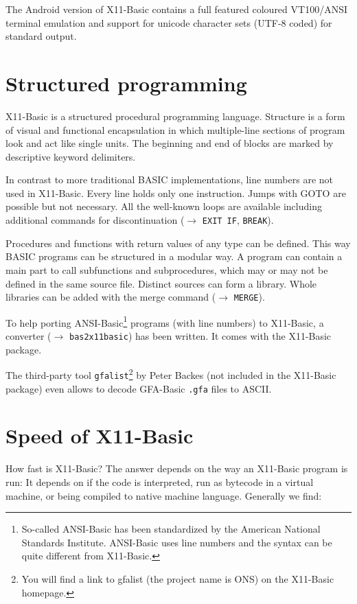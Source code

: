 The Android version of X11-Basic contains a full featured coloured 
VT100/ANSI terminal emulation and support for unicode character sets 
(UTF-8 coded) for standard output.


\section*{Structured programming}

X11-Basic is a structured procedural programming language.  Structure is a form
of visual and functional encapsulation in which multiple-line sections of
program look and act like single units. The beginning and end of blocks are
marked by descriptive keyword delimiters.

In contrast to more traditional BASIC implementations, line  numbers are not
used in X11-Basic. Every line holds only one instruction. Jumps with GOTO are
possible but not necessary. All the well-known loops are available including 
additional commands for discontinuation ($\longrightarrow$ \verb|EXIT IF|, \verb|BREAK|). 

Procedures and functions with return values of any type can be defined. This way
BASIC  programs can be structured in a modular way. A program can contain a main
part to call subfunctions and subprocedures, which may or may not be defined in
the same source file. Distinct sources can form a library. Whole libraries can
be added with the merge command ($\longrightarrow$ \verb|MERGE|).

To help porting ANSI-Basic\footnote{So-called ANSI-Basic has been  standardized
by the American National Standards Institute. ANSI-Basic uses line numbers and
the syntax can be quite different from X11-Basic.} programs (with line numbers)
to X11-Basic, a converter ($\longrightarrow$ \verb|bas2x11basic|) has been written. It comes
with the X11-Basic package. 

The third-party tool \verb|gfalist|\footnote{You will find a link to gfalist 
(the project name is ONS) on the X11-Basic homepage.} by Peter Backes (not
included in the X11-Basic package) even allows to decode GFA-Basic \verb|.gfa|
files to ASCII.

\section*{Speed of X11-Basic}

How fast is X11-Basic? The answer depends on the way an X11-Basic program is
run: It depends on if the code is interpreted, run as bytecode in a virtual
machine, or being compiled to native machine language. Generally we find:

